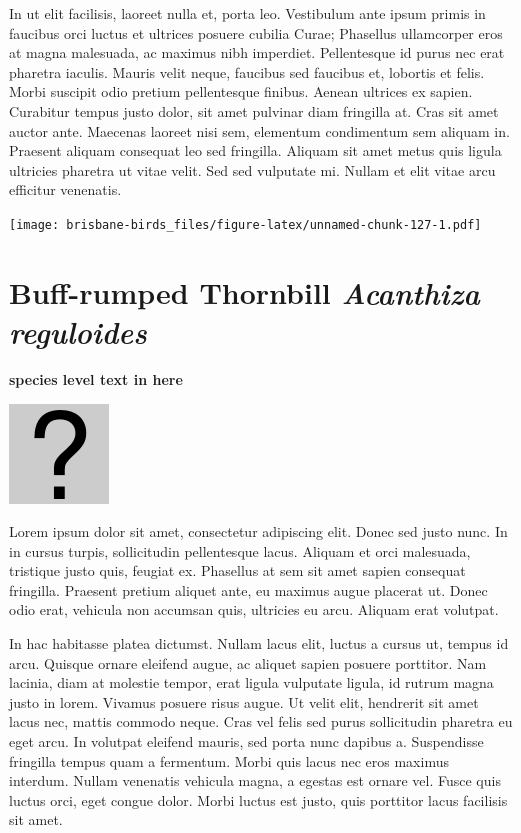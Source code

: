 \documentclass[]{book}
\let\origfigure\figure
\let\endorigfigure\endfigure
\renewenvironment{figure}[1][2] {
  \expandafter\origfigure\expandafter[H]
} {
  \endorigfigure
}
\begin{document}
In ut elit facilisis, laoreet nulla et, porta leo. Vestibulum ante ipsum
primis in faucibus orci luctus et ultrices posuere cubilia Curae;
Phasellus ullamcorper eros at magna malesuada, ac maximus nibh
imperdiet. Pellentesque id purus nec erat pharetra iaculis. Mauris velit
neque, faucibus sed faucibus et, lobortis et felis. Morbi suscipit odio
pretium pellentesque finibus. Aenean ultrices ex sapien. Curabitur
tempus justo dolor, sit amet pulvinar diam fringilla at. Cras sit amet
auctor ante. Maecenas laoreet nisi sem, elementum condimentum sem
aliquam in. Praesent aliquam consequat leo sed fringilla. Aliquam sit
amet metus quis ligula ultricies pharetra ut vitae velit. Sed sed
vulputate mi. Nullam et elit vitae arcu efficitur venenatis.

\begin{figure}
\centering
\texttt{[image: brisbane-birds\_files/figure-latex/unnamed-chunk-127-1.pdf]}
\caption{\label{fig:unnamed-chunk-127}insert figure caption}
\end{figure}

\section{\texorpdfstring{Buff-rumped Thornbill \emph{Acanthiza
reguloides}}{Buff-rumped Thornbill Acanthiza reguloides}}\label{buff-rumped-thornbill-acanthiza-reguloides}

\textbf{species level text in here}

\begin{figure}
\centering
\includegraphics{assets/missing.png}
\caption{No image for species}
\end{figure}

Lorem ipsum dolor sit amet, consectetur adipiscing elit. Donec sed justo
nunc. In in cursus turpis, sollicitudin pellentesque lacus. Aliquam et
orci malesuada, tristique justo quis, feugiat ex. Phasellus at sem sit
amet sapien consequat fringilla. Praesent pretium aliquet ante, eu
maximus augue placerat ut. Donec odio erat, vehicula non accumsan quis,
ultricies eu arcu. Aliquam erat volutpat.

In hac habitasse platea dictumst. Nullam lacus elit, luctus a cursus ut,
tempus id arcu. Quisque ornare eleifend augue, ac aliquet sapien posuere
porttitor. Nam lacinia, diam at molestie tempor, erat ligula vulputate
ligula, id rutrum magna justo in lorem. Vivamus posuere risus augue. Ut
velit elit, hendrerit sit amet lacus nec, mattis commodo neque. Cras vel
felis sed purus sollicitudin pharetra eu eget arcu. In volutpat eleifend
mauris, sed porta nunc dapibus a. Suspendisse fringilla tempus quam a
fermentum. Morbi quis lacus nec eros maximus interdum. Nullam venenatis
vehicula magna, a egestas est ornare vel. Fusce quis luctus orci, eget
congue dolor. Morbi luctus est justo, quis porttitor lacus facilisis sit
amet.
\end{document}
